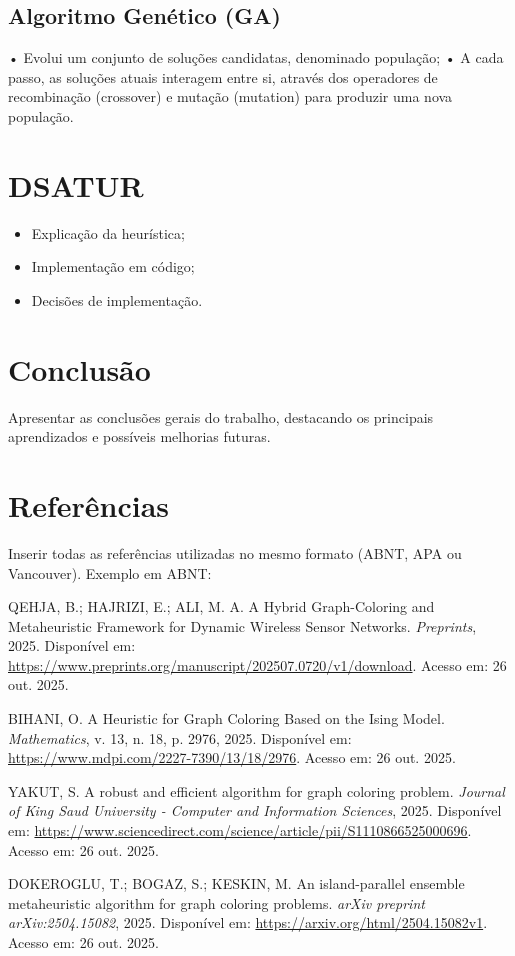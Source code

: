 \documentclass[12pt,a4paper]{article}
\begin{document}
\subsection{Algoritmo Genético (GA)}
• Evolui um conjunto de soluções candidatas, denominado população;
• A cada passo, as soluções atuais interagem entre si, através dos operadores
de recombinação (crossover) e mutação (mutation) para produzir uma nova
população.

\section{DSATUR}
\begin{itemize}
\item Explicação da heurística;
\item Implementação em código;
\item Decisões de implementação.
\end{itemize}


\section{Conclusão}
Apresentar as conclusões gerais do trabalho, destacando os principais aprendizados e possíveis melhorias futuras.

\section*{Referências}

Inserir todas as referências utilizadas no mesmo formato (ABNT, APA ou Vancouver).  
Exemplo em ABNT:

\begin{thebibliography}{99}

QEHJA, B.; HAJRIZI, E.; ALI, M. A. A Hybrid Graph-Coloring and Metaheuristic Framework for Dynamic Wireless Sensor Networks. \textit{Preprints}, 2025. Disponível em: \url{https://www.preprints.org/manuscript/202507.0720/v1/download}. Acesso em: 26 out. 2025.

BIHANI, O. A Heuristic for Graph Coloring Based on the Ising Model. \textit{Mathematics}, v. 13, n. 18, p. 2976, 2025. Disponível em: \url{https://www.mdpi.com/2227-7390/13/18/2976}. Acesso em: 26 out. 2025.

YAKUT, S. A robust and efficient algorithm for graph coloring problem. \textit{Journal of King Saud University - Computer and Information Sciences}, 2025. Disponível em: \url{https://www.sciencedirect.com/science/article/pii/S1110866525000696}. Acesso em: 26 out. 2025.

DOKEROGLU, T.; BOGAZ, S.; KESKIN, M. An island-parallel ensemble metaheuristic algorithm for graph coloring problems. \textit{arXiv preprint arXiv:2504.15082}, 2025. Disponível em: \url{https://arxiv.org/html/2504.15082v1}. Acesso em: 26 out. 2025.


\end{thebibliography}
\end{document}
